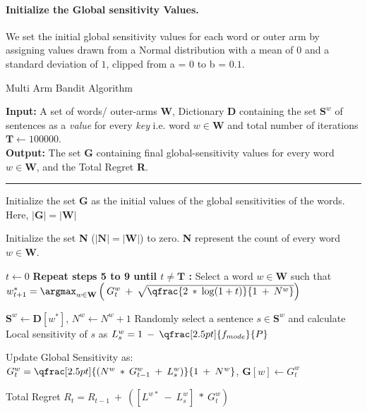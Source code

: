     \paragraph{Initialize the Global sensitivity Values.} We set the initial global sensitivity values for each word or outer arm by assigning values drawn from a Normal distribution with a mean of $0$ and a standard deviation of $1$, clipped from a = $0$ to b = $0.1$.


\begin{algorithm}
    \caption{Multi Arm Bandit Algorithm}\label{multi-arm}
    \textbf{Input: } A set of words/ outer-arms \textbf{W}, Dictionary \textbf{D} containing the set $\textbf{S}^{w}$ of sentences as a \textit{value} for every \textit{key} i.e. word $w \in \textbf{W}$ and total number of iterations $\textbf{T} \gets 100000$.\\

    \textbf{Output: } The set \textbf{G} containing final global-sensitivity values for every word $w \in \textbf{W}$, and the Total Regret \textbf{R}.
    \vspace{0.1cm}
    \hrule %
    \vspace{0.1cm}

    \begin{algorithmic}[1]
        \State Initialize the set \textbf{G} as the initial values of the global sensitivities of the words. Here, $|\textbf{G}| = |\textbf{W}|$

        \State Initialize the set \textbf{N} ($|\textbf{N}| = |\textbf{W}|$) to zero. \textbf{N} represent the count of every word $w \in \textbf{W}$.

        \State $t \gets 0$
        \State \textbf{Repeat steps 5 to 9 until $t \neq \textbf{T}$ :}
        \State Select a word $w \in \textbf{W}$ such that 
        $w^*_{t + 1} = \argmax_{w \in \textbf{W}} \left(\:G^w_t \:+\: \sqrt{\qfrac{2 \: * \: \log (1 + t)}{1\: + \:N^w}}\right) $

        \State $\textbf{S}^{w} \gets \textbf{D}[w^{*}]$, $N^w \gets N^w + 1$
        \State Randomly select a sentence $s \in \textbf{S}^{w}$ and calculate Local sensitivity of $s$ as $L^w_s = 1 \: - \: \qfrac[2.5pt]{f_{mode}}{P}$

        \State Update Global Sensitivity as: $G^{w}_{t} = \qfrac[2.5pt]{(N^w \:* \:G^{w}_{t - 1} \: + \: L^w_{s})}{ 1 \:+ \:N^w}$, $\textbf{G}[w] \gets G^{w}_{t}$ 

        \State Total Regret $R_t = R_{t-1} \: + \: ([L^{w*}\: - \: L^w_s] \: * \: G^w_t)$
    \end{algorithmic}
\end{algorithm}

